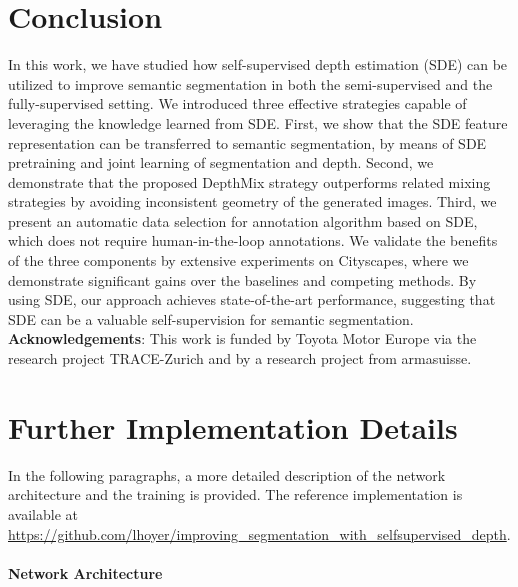 \documentclass[final]{cvpr}
\begin{document}
 \section{Conclusion}
\label{sec:conclusion}

In this work, we have studied how self-supervised depth estimation (SDE) can be utilized to improve semantic segmentation in both the semi-supervised and the fully-supervised setting. We introduced three effective strategies capable of leveraging the knowledge learned from SDE. First, we show that the SDE feature representation can be transferred to semantic segmentation, by means of SDE pretraining and joint learning of segmentation and depth. 
Second, we demonstrate that the proposed DepthMix strategy outperforms related mixing strategies by avoiding inconsistent geometry of the generated images.
Third, we present an automatic data selection for annotation algorithm based on SDE, which does not require human-in-the-loop annotations. 
We validate the benefits of the three components by extensive experiments on Cityscapes, where we demonstrate significant gains over the baselines and competing methods. By using SDE, our approach achieves state-of-the-art performance, suggesting that SDE can be a valuable self-supervision for semantic segmentation. 
\vspace{2mm}
\noindent
\textbf{Acknowledgements}: This work is funded by Toyota Motor Europe via the research project TRACE-Zurich and by a research project from armasuisse.
\FloatBarrier

{\small


}

\clearpage

\renewcommand\thesection{\Alph{section}}
\renewcommand{\thefigure}{S\arabic{figure}}
\renewcommand{\thetable}{S\arabic{table}}
\setcounter{section}{0}

\section{Further Implementation Details}

In the following paragraphs, a more detailed description of the network architecture and the training is provided. The reference implementation is available at \url{https://github.com/lhoyer/improving_segmentation_with_selfsupervised_depth}.

\paragraph{Network Architecture}
\end{document}

